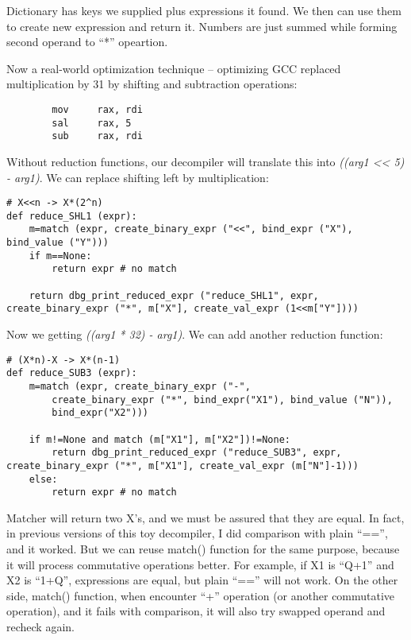 ﻿\documentclass[12pt]{article}
\begin{document}
Dictionary has keys we supplied plus expressions it found.
We then can use them to create new expression and return it.
Numbers are just summed while forming second operand to ``*'' opeartion.

Now a real-world optimization technique --
optimizing GCC replaced multiplication by 31 by shifting and subtraction operations:

\begin{lstlisting}
        mov     rax, rdi
        sal     rax, 5
        sub     rax, rdi
\end{lstlisting}

Without reduction functions, our decompiler will translate this into \textit{((arg1 << 5) - arg1)}.
We can replace shifting left by multiplication:

\begin{lstlisting}
# X<<n -> X*(2^n)
def reduce_SHL1 (expr):
    m=match (expr, create_binary_expr ("<<", bind_expr ("X"), bind_value ("Y")))
    if m==None:
        return expr # no match
    
    return dbg_print_reduced_expr ("reduce_SHL1", expr, create_binary_expr ("*", m["X"], create_val_expr (1<<m["Y"])))
\end{lstlisting}

Now we getting \textit{((arg1 * 32) - arg1)}.
We can add another reduction function:

\begin{lstlisting}
# (X*n)-X -> X*(n-1)
def reduce_SUB3 (expr):
    m=match (expr, create_binary_expr ("-",
        create_binary_expr ("*", bind_expr("X1"), bind_value ("N")),
        bind_expr("X2")))
    
    if m!=None and match (m["X1"], m["X2"])!=None:
        return dbg_print_reduced_expr ("reduce_SUB3", expr, create_binary_expr ("*", m["X1"], create_val_expr (m["N"]-1)))
    else:
        return expr # no match
\end{lstlisting}

Matcher will return two X's, and we must be assured that they are equal.
In fact, in previous versions of this toy decompiler, I did comparison with plain ``=='', and it worked.
But we can reuse match() function for the same purpose, because it will process commutative operations better.
For example, if X1 is ``Q+1'' and X2 is ``1+Q'', expressions are equal, but plain ``=='' will not work.
On the other side, match() function, when encounter ``+'' operation (or another commutative operation),
and it fails with comparison, it will also try swapped operand and recheck again.
\end{document}
